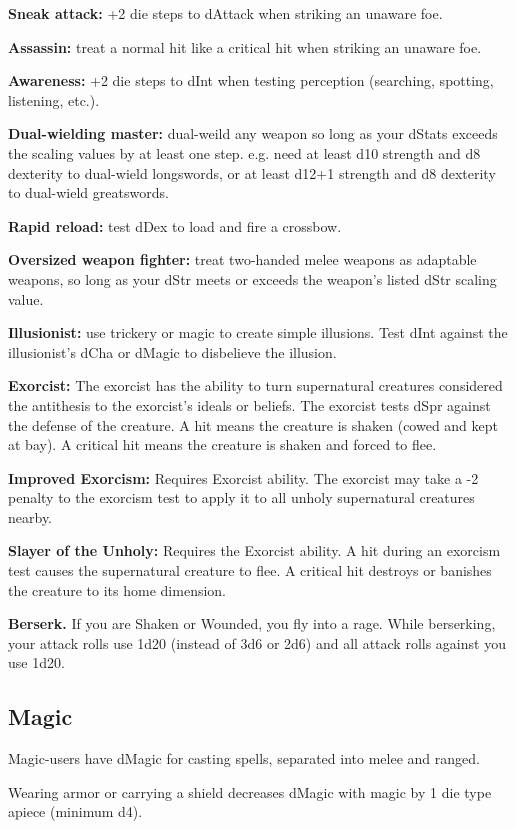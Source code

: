 \documentclass[10pt,twoside,twocolumn,openany]{book}
\begin{document}
\par \textbf{Sneak attack:}  +2 die steps to dAttack when striking an unaware foe.
\par \textbf{Assassin:} treat a normal hit like a critical hit when striking an unaware foe.
\par \textbf{Awareness:} +2 die steps to dInt when testing perception (searching, spotting, listening, etc.).
\par \textbf{Dual-wielding master:} dual-weild any weapon so long as your dStats exceeds the scaling values by at least one step. e.g. need at least d10 strength and d8 dexterity to dual-wield longswords, or at least d12+1 strength and d8 dexterity to dual-wield greatswords.
\par \textbf{Rapid reload:} test dDex to load and fire a crossbow.
\par \textbf{Oversized weapon fighter:} treat two-handed melee weapons as adaptable weapons, so long as your dStr meets or exceeds the weapon's listed dStr scaling value.
\par \textbf{Illusionist:} use trickery or magic to create simple illusions. Test dInt against the illusionist's dCha or dMagic to disbelieve the illusion.
\par \textbf{Exorcist:} The exorcist has the ability to turn supernatural creatures considered the antithesis to the exorcist's ideals or beliefs. The exorcist tests dSpr against the defense of the creature. A hit means the creature is shaken (cowed and kept at bay). A critical hit means the creature is shaken and forced to flee.
\par \textbf{Improved Exorcism:} Requires Exorcist ability. The exorcist may take a -2 penalty to the exorcism test to apply it to all unholy supernatural creatures nearby.
\par \textbf{Slayer of the Unholy:} Requires the Exorcist ability. A hit during an exorcism test causes the supernatural creature to flee. A critical hit destroys or banishes the creature to its home dimension.
\par \textbf{Berserk.} If you are Shaken or Wounded, you fly into a rage. While berserking, your attack rolls use 1d20 (instead of 3d6 or 2d6) and all attack rolls against you use 1d20.

\subsection{Magic}
Magic-users have dMagic for casting spells, separated into melee and ranged.
\par Wearing armor or carrying a shield decreases dMagic with magic by 1 die type apiece (minimum d4).
\end{document}
